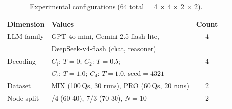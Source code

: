 \begin{table}[t]
\centering
\caption{Experimental configurations (64 total = 4 $\times$ 4 $\times$ 2 $\times$ 2).}
\label{tab:configs}
\footnotesize
\begin{tabular}{llcl}
\toprule
\textbf{Dimension} & \quad\textbf{Values} & \textbf{Count} \\
\midrule
LLM family & \quad GPT-4o-mini, Gemini-2.5-flash-lite, & 4 \\
           & \quad DeepSeek-v4-flash (chat, reasoner) & \\
Decoding   & \quad $C_1$: $T{=}0$; $C_2$: $T{=}0.5$; & 4 \\
           & \quad $C_3$: $T{=}1.0$; $C_4$: $T{=}1.0$, seed$=4321$ & \\
Dataset    & \quad MIX (100\,Qs, 30 runs), PRO (60\,Qs, 20 runs) & 2 \\
Node split & \quad 6/4 (60-40), 7/3 (70-30), $N{=}10$ & 2 \\
\bottomrule
\end{tabular}
\end{table}
